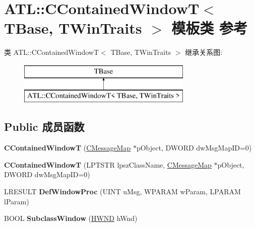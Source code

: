 \hypertarget{class_a_t_l_1_1_c_contained_window_t}{}\section{A\+TL\+:\+:C\+Contained\+WindowT$<$ T\+Base, T\+Win\+Traits $>$ 模板类 参考}
\label{class_a_t_l_1_1_c_contained_window_t}
类 A\+TL\+:\+:C\+Contained\+WindowT$<$ T\+Base, T\+Win\+Traits $>$ 继承关系图\+:\begin{figure}[H]
\begin{center}
\leavevmode
\includegraphics[height=2.000000cm]{class_a_t_l_1_1_c_contained_window_t}
\end{center}
\end{figure}
\subsection*{Public 成员函数}
\begin{DoxyCompactItemize}
\item 
\mbox{\label{class_a_t_l_1_1_c_contained_window_t_af5dc11877f713e0619160f565a9677d2}} 
{\bfseries C\+Contained\+WindowT} (\hyperlink{class_a_t_l_1_1_c_message_map}{C\+Message\+Map} $\ast$p\+Object, D\+W\+O\+RD dw\+Msg\+Map\+ID=0)
\item 
\mbox{\label{class_a_t_l_1_1_c_contained_window_t_a95d216daf1b7fab5016291279176d8b0}} 
{\bfseries C\+Contained\+WindowT} (L\+P\+T\+S\+TR lpsz\+Class\+Name, \hyperlink{class_a_t_l_1_1_c_message_map}{C\+Message\+Map} $\ast$p\+Object, D\+W\+O\+RD dw\+Msg\+Map\+ID=0)
\item 
\mbox{\label{class_a_t_l_1_1_c_contained_window_t_a2fc23e609fa932063dda829ab93a2f27}} 
L\+R\+E\+S\+U\+LT {\bfseries Def\+Window\+Proc} (U\+I\+NT u\+Msg, W\+P\+A\+R\+AM w\+Param, L\+P\+A\+R\+AM l\+Param)
\item 
\mbox{\label{class_a_t_l_1_1_c_contained_window_t_a68e84ee957c4f5f9b97f5070d4677804}} 
B\+O\+OL {\bfseries Subclass\+Window} (\hyperlink{interfacevoid}{H\+W\+ND} h\+Wnd)
\end{DoxyCompactItemize}
